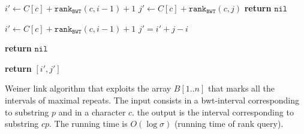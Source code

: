 \documentclass{article}
\begin{document}
\begin{algorithm}[t]

{
		$i'\gets C[c]+\mathtt{rank}_{\mathtt{BWT}}(c,i-1)+1$\;
		$j'\gets C[c]+\mathtt{rank}_{\mathtt{BWT}}(c,j)$\;
		{
			{\bf return} $\mathtt{nil}$\;			
		}
}
{
		{
			$i'\gets C[c]+\mathtt{rank}_{\mathtt{BWT}}(c,i-1)+1$\;
			$j'=i'+j-i$\;
		}
		{
			{\bf return} $\mathtt{nil}$\;

		}
}
{\bf return} $[i',j']$\;
\caption{Weiner link algorithm that exploits the array $B[1..n]$ 
that marks all the intervals of maximal repeats. The input consists in  
a bwt-interval corresponding to substring $p$ and in a character $c$. 
the output is the interval corresponding to substring $cp$. The running 
time is $O(\log\sigma)$ (running time of rank query). }
\end{algorithm}
\end{document}
